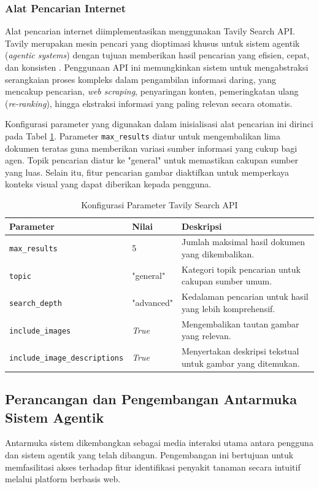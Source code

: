 \subsubsection{Alat Pencarian Internet}
Alat pencarian internet diimplementasikan menggunakan Tavily Search API. Tavily merupakan mesin pencari yang dioptimasi khusus untuk sistem agentik (\textit{agentic systems}) dengan tujuan memberikan hasil pencarian yang efisien, cepat, dan konsisten \parencite{TavilyaiTavilypython2026}. Penggunaan API ini memungkinkan sistem untuk mengabstraksi serangkaian proses kompleks dalam pengambilan informasi daring, yang mencakup pencarian, \textit{web scraping}, penyaringan konten, pemeringkatan ulang (\textit{re-ranking}), hingga ekstraksi informasi yang paling relevan secara otomatis.

Konfigurasi parameter yang digunakan dalam inisialisasi alat pencarian ini dirinci pada Tabel \ref{tab:tavily_parameters}. Parameter \texttt{max\_results} diatur untuk mengembalikan lima dokumen teratas guna memberikan variasi sumber informasi yang cukup bagi agen. Topik pencarian diatur ke "general" untuk memastikan cakupan sumber yang luas. Selain itu, fitur pencarian gambar diaktifkan untuk memperkaya konteks visual yang dapat diberikan kepada pengguna.

\begin{table}[H]
    \centering
    \caption{Konfigurasi Parameter Tavily Search API}
    \label{tab:tavily_parameters}
    \small
    \begin{tabular}{|l|l|p{7cm}|}
    \hline
    \textbf{Parameter} & \textbf{Nilai} & \textbf{Deskripsi} \\ \hline
    \texttt{max\_results} & 5 & Jumlah maksimal hasil dokumen yang dikembalikan. \\ \hline
    \texttt{topic} & "general" & Kategori topik pencarian untuk cakupan sumber umum. \\ \hline
    \texttt{search\_depth} & "advanced" & Kedalaman pencarian untuk hasil yang lebih komprehensif. \\ \hline
    \texttt{include\_images} & \textit{True} & Mengembalikan tautan gambar yang relevan. \\ \hline
    \texttt{include\_image\_descriptions} & \textit{True} & Menyertakan deskripsi tekstual untuk gambar yang ditemukan. \\ \hline
    \end{tabular}
\end{table}

\subsection{Perancangan dan Pengembangan Antarmuka Sistem Agentik}
Antarmuka sistem dikembangkan sebagai media interaksi utama antara pengguna dan sistem agentik yang telah dibangun. Pengembangan ini bertujuan untuk memfasilitasi akses terhadap fitur identifikasi penyakit tanaman secara intuitif melalui platform berbasis web.

